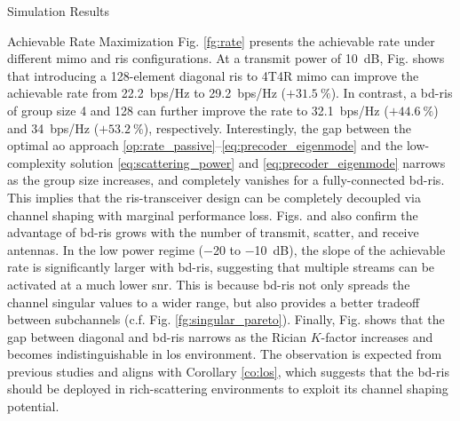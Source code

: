 \documentclass[journal]{IEEEtran}
\begin{document}
\begin{section}{Simulation Results}
\begin{subsection}{Achievable Rate Maximization}
		Fig. \ref{fg:rate} presents the achievable rate under different \gls{mimo} and \gls{ris} configurations.
		At a transmit power of \qty{10}{dB}, Fig.  shows that introducing a 128-element diagonal \gls{ris} to 4T4R \gls{mimo} can improve the achievable rate from \qty{22.2}{bps/Hz} to \qty{29.2}{bps/Hz} ($+\qty{31.5}{\percent}$).
		In contrast, a \gls{bd}-\gls{ris} of group size 4 and 128 can further improve the rate to \qty{32.1}{bps/Hz} ($+\qty{44.6}{\percent}$) and \qty{34}{bps/Hz}  ($+\qty{53.2}{\percent}$), respectively.
		Interestingly, the gap between the optimal \gls{ao} approach \eqref{op:rate_passive}--\eqref{eq:precoder_eigenmode} and the low-complexity solution \eqref{eq:scattering_power} and \eqref{eq:precoder_eigenmode} narrows as the group size increases, and completely vanishes for a fully-connected \gls{bd}-\gls{ris}.
		This implies that the \gls{ris}-transceiver design can be completely decoupled via channel shaping with marginal performance loss.
		Figs.  and  also confirm the advantage of \gls{bd}-\gls{ris} grows with the number of transmit, scatter, and receive antennas.
		In the low power regime (\num{-20} to \qty{-10}{dB}), the slope of the achievable rate is significantly larger with \gls{bd}-\gls{ris}, suggesting that multiple streams can be activated at a much lower \gls{snr}.
		This is because \gls{bd}-\gls{ris} not only spreads the channel singular values to a wider range, but also provides a better tradeoff between subchannels (c.f. Fig. \ref{fg:singular_pareto}).
		Finally, Fig.  shows that the gap between diagonal and \gls{bd}-\gls{ris} narrows as the Rician $K$-factor increases and becomes indistinguishable in \gls{los} environment.
		The observation is expected from previous studies \cite{Shen2020a,Li2023b,Nerini2023} and aligns with Corollary \ref{co:los}, which suggests that the \gls{bd}-\gls{ris} should be deployed in rich-scattering environments to exploit its channel shaping potential.
	\end{subsection}
\end{section}
\end{document}
